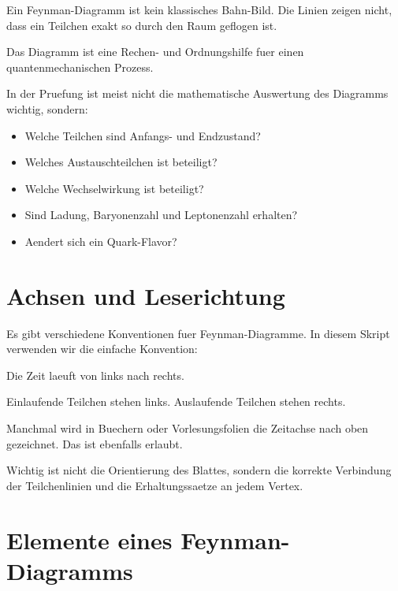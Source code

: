 \begin{conceptbox}
Ein Feynman-Diagramm ist kein klassisches Bahn-Bild.
Die Linien zeigen nicht, dass ein Teilchen exakt so durch den Raum geflogen ist.

Das Diagramm ist eine Rechen- und Ordnungshilfe fuer einen quantenmechanischen
Prozess.
\end{conceptbox}

\begin{examtipbox}
In der Pruefung ist meist nicht die mathematische Auswertung des Diagramms wichtig,
sondern:
\begin{itemize}
    \item Welche Teilchen sind Anfangs- und Endzustand?
    \item Welches Austauschteilchen ist beteiligt?
    \item Welche Wechselwirkung ist beteiligt?
    \item Sind Ladung, Baryonenzahl und Leptonenzahl erhalten?
    \item Aendert sich ein Quark-Flavor?
\end{itemize}
\end{examtipbox}

\section{Achsen und Leserichtung}

Es gibt verschiedene Konventionen fuer Feynman-Diagramme.
In diesem Skript verwenden wir die einfache Konvention:

\begin{notebox}
Die Zeit laeuft von links nach rechts.

Einlaufende Teilchen stehen links.
Auslaufende Teilchen stehen rechts.
\end{notebox}

\begin{conceptbox}
Manchmal wird in Buechern oder Vorlesungsfolien die Zeitachse nach oben gezeichnet.
Das ist ebenfalls erlaubt.

Wichtig ist nicht die Orientierung des Blattes, sondern die korrekte Verbindung der
Teilchenlinien und die Erhaltungssaetze an jedem Vertex.
\end{conceptbox}

\section{Elemente eines Feynman-Diagramms}

